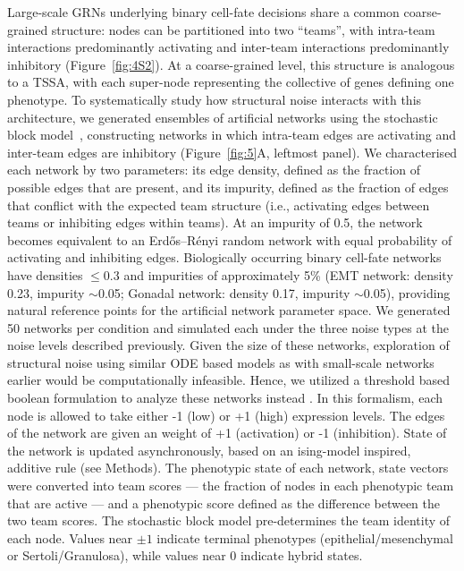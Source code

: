 \documentclass[11pt]{article}
\begin{document}
Large-scale GRNs underlying binary cell-fate decisions share a common coarse-grained structure: nodes can be partitioned into two ``teams'', with intra-team interactions predominantly activating and inter-team interactions predominantly inhibitory (Figure~\ref{fig:4S2}). At a coarse-grained level, this structure is analogous to a TSSA, with each super-node representing the collective of genes defining one phenotype. To systematically study how structural noise interacts with this architecture, we generated ensembles of artificial networks using the stochastic block model~\cite{Holland1983STOCHASTIC}, constructing networks in which intra-team edges are activating and inter-team edges are inhibitory (Figure~\ref{fig:5}A, leftmost panel). We characterised each network by two parameters: its edge density, defined as the fraction of possible edges that are present, and its impurity, defined as the fraction of edges that conflict with the expected team structure (i.e., activating edges between teams or inhibiting edges within teams). At an impurity of 0.5, the network becomes equivalent to an Erd\H{o}s--R\'{e}nyi random network with equal probability of activating and inhibiting edges. Biologically occurring binary cell-fate networks have densities $\leq 0.3$ and impurities of approximately 5\% (EMT network: density 0.23, impurity $\sim$0.05; Gonadal network: density 0.17, impurity $\sim$0.05), providing natural reference points for the artificial network parameter space. We generated 50 networks per condition and simulated each under the three noise types at the noise levels described previously. Given the size of these networks, exploration of structural noise using similar ODE based models as with small-scale networks earlier would be computationally infeasible. Hence, we utilized a threshold based boolean formulation to analyze these networks instead \cite{FontClos2018}. In this formalism, each node is allowed to take either -1 (low) or +1 (high) expression levels. The edges of the network are given an weight of +1 (activation) or -1 (inhibition). State of the network is updated asynchronously, based on an ising-model inspired, additive rule (see Methods). The phenotypic state of each network, state vectors were converted into team scores --- the fraction of nodes in each phenotypic team that are active --- and a phenotypic score defined as the difference between the two team scores. The stochastic block model pre-determines the team identity of each node. Values near $\pm 1$ indicate terminal phenotypes (epithelial/mesenchymal or Sertoli/Granulosa), while values near 0 indicate hybrid states.
\end{document}
